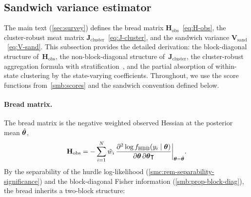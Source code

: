 
\subsection{Sandwich variance estimator}
\label{smc:sandwich}

The main text (\cref{sec:survey}) defines the bread matrix
$\mathbf{H}_{\mathrm{obs}}$~\eqref{eq:H-obs}, the cluster-robust meat
matrix $\mathbf{J}_{\mathrm{cluster}}$~\eqref{eq:J-cluster}, and the
sandwich variance $\mathbf{V}_{\mathrm{sand}}$~\eqref{eq:V-sand}.  This
subsection provides the detailed derivation: the block-diagonal
structure of~$\mathbf{H}_{\mathrm{obs}}$, the non-block-diagonal
structure of~$\mathbf{J}_{\mathrm{cluster}}$, the cluster-robust
aggregation formula with stratification~\citep{Binder1983}, and the partial absorption of
within-state clustering by the state-varying coefficients.  Throughout,
we use the score functions from~\cref{smb:scores} and the sandwich
convention defined below.


\paragraph{Bread matrix.}
The bread matrix is the negative weighted observed Hessian at the
posterior mean $\hat{\boldsymbol{\theta}}$,
\begin{equation}\label{smc:eq-H}
  \mathbf{H}_{\mathrm{obs}}
  = -\sum_{i=1}^{N}\tilde{w}_i\,
    \frac{\partial^2\log f_{\operatorname{HBB}}(y_i \mid \boldsymbol{\theta})}
         {\partial\boldsymbol{\theta}\,\partial\boldsymbol{\theta}\intercal}
    \bigg|_{\boldsymbol{\theta} = \hat{\boldsymbol{\theta}}}.
\end{equation}
By the separability of the hurdle log-likelihood
(\cref{smc:rem-separability-significance}) and the block-diagonal Fisher
information (\cref{smb:prop-block-diag}), the bread inherits a two-block
structure:

